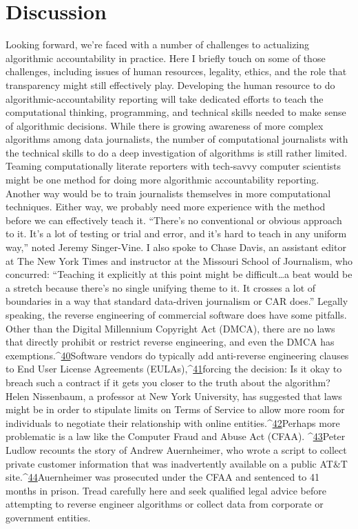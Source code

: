 \chapter{Discussion }
Looking forward, we're faced with a number of challenges to actualizing algorithmic accountability in practice. Here I briefly touch on some of those challenges, including issues of human resources, legality, ethics, and the role that transparency might still effectively play. 
Developing the human resource to do algorithmic-accountability reporting will take dedicated efforts to teach the computational thinking, programming, and technical skills needed to make sense of algorithmic decisions. While there is growing awareness of more complex algorithms among data journalists, the number of computational journalists with the technical skills to do a deep investigation of algorithms is still rather limited. Teaming computationally literate reporters with tech-savvy computer scientists might be one method for doing more algorithmic accountability reporting. Another way would be to train journalists themselves in more computational techniques. Either way, we probably need more experience with the method before we can effectively teach it. ``There's no conventional or obvious approach to it. It's a lot of testing or trial and error, and it's hard to teach in any uniform way,'' noted Jeremy Singer-Vine. I also spoke to Chase Davis, an assistant editor at The New York Times and instructor at the Missouri School of Journalism, who concurred: ``Teaching it explicitly at this point might be difficult…a beat would be a stretch because there's no single unifying theme to it. It crosses a lot of boundaries in a way that standard data-driven journalism or CAR does.'' 
Legally speaking, the reverse engineering of commercial software does have some pitfalls. Other than the Digital Millennium Copyright Act (DMCA), there are no laws that directly prohibit or restrict reverse engineering, and even the DMCA has exemptions.^{\href{#endnotes}{40}}Software vendors do typically add anti-reverse engineering clauses to End User License Agreements (EULAs),^{\href{#endnotes}{41}}forcing the decision: Is it okay to breach such a contract if it gets you closer to the truth about the algorithm? Helen Nissenbaum, a professor at New York University, has suggested that laws might be in order to stipulate limits on Terms of Service to allow more room for individuals to negotiate their relationship with online entities.^{\href{#endnotes}{42}}Perhaps more problematic is a law like the Computer Fraud and Abuse Act (CFAA). ^{\href{#endnotes}{43}}Peter Ludlow recounts the story of Andrew Auernheimer, who wrote a script to collect private customer information that was inadvertently available on a public AT&T site.^{\href{#endnotes}{44}}Auernheimer was prosecuted under the CFAA and sentenced to 41 months in prison. Tread carefully here and seek qualified legal advice before attempting to reverse engineer algorithms or collect data from corporate or government entities. 
